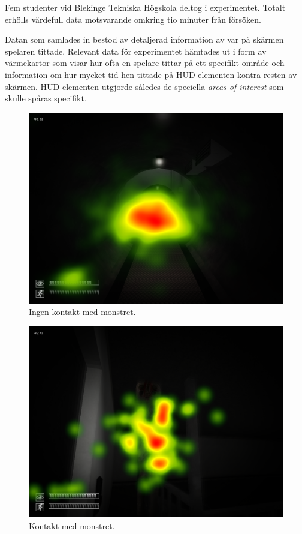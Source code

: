 \documentclass{article}
\begin{document}
Fem studenter vid Blekinge Tekniska Högskola deltog i experimentet. Totalt erhölls värdefull data motsvarande omkring tio minuter från försöken.

Datan som samlades in bestod av detaljerad information av var på skärmen spelaren tittade. Relevant data för experimentet hämtades ut i form av värmekartor som visar hur ofta en spelare tittar på ett specifikt område och information om hur mycket tid hen tittade på HUD-elementen kontra resten av skärmen. HUD-elementen utgjorde således de speciella \textit{areas-of-interest} som skulle spåras specifikt.

\begin{figure}[h!]
    \begin{center}
        \includegraphics*[width=0.63\columnwidth]{experiment/NoContact_Heatmap.png}
        \caption{Ingen kontakt med monstret.}
        \label{no_contact}
    \end{center}
\end{figure}

\begin{figure}[h!]
    \begin{center}
        \includegraphics*[width=0.63\columnwidth]{experiment/Contact_Heatmap.png}
        \caption{Kontakt med monstret.}
        \label{contact}
    \end{center}
\end{figure}
\end{document}
